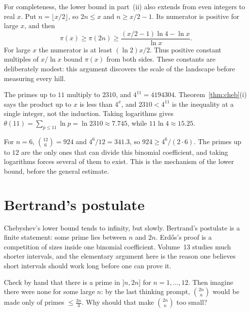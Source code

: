 For completeness, the lower bound in part~(ii) also extends from even integers to real $x$. Put $n=\lfloor x/2\rfloor$, so $2n\le x$ and $n\ge x/2-1$. Its numerator is positive for large $x$, and then
\[
\pi(x)\ge\pi(2n)\ge
\frac{(x/2-1)\ln4-\ln x}{\ln x}.
\]
For large $x$ the numerator is at least $(\ln2)x/2$. Thus positive constant multiples of $x/\ln x$ bound $\pi(x)$ from both sides. These constants are deliberately modest: this argument discovers the scale of the landscape before measuring every hill.

\begin{examplex}
The primes up to $11$ multiply to $2310$, and $4^{11}=4194304$. Theorem~\ref{thm:cheb}(i) says the product up to $x$ is less than $4^x$, and $2310<4^{11}$ is the inequality at a single integer, not the induction. Taking logarithms gives $\theta(11)=\sum_{p\le 11}\ln p=\ln 2310\approx 7.745$, while $11\ln 4\approx 15.25$.
\end{examplex}

\begin{examplex}
For $n=6$, $\binom{12}{6}=924$ and $4^6/12=341.3$, so $924\ge 4^6/(2\cdot 6)$. The primes up to $12$ are the only ones that can divide this binomial coefficient, and taking logarithms forces several of them to exist. This is the mechanism of the lower bound, before the general estimate.
\end{examplex}

\section{Bertrand's postulate}

Chebyshev's lower bound tends to infinity, but slowly. Bertrand's postulate is a finite statement: some prime lies between $n$ and $2n$. Erdős's proof is a competition of sizes inside one binomial coefficient. Volume~13 studies much shorter intervals, and the elementary argument here is the reason one believes short intervals should work long before one can prove it.

\begin{think}
Check by hand that there is a prime in $]n,2n]$ for $n=1,\dots,12$. Then imagine there were none for some large $n$: by the last thinking prompt, $\binom{2n}n$ would be made only of primes $\le\frac{2n}3$. Why should that make $\binom{2n}n$ too small?
\end{think}

